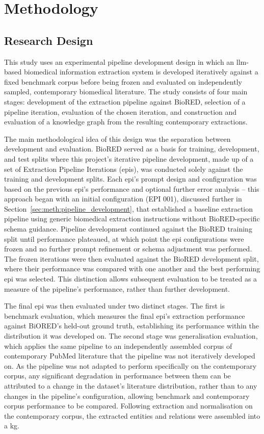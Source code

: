\chapter{Methodology}

\section{Research Design}
\label{sec:meth:research_design}
This study uses an experimental pipeline development design in which an \gls{llm}-based biomedical information extraction system is developed iteratively against a fixed benchmark corpus before being frozen and evaluated on independently sampled, contemporary biomedical literature. The study consists of four main stages: development of the extraction pipeline against BioRED, selection of a pipeline iteration, evaluation of the chosen iteration, and construction and evaluation of a knowledge graph from the resulting contemporary extractions.

The main methodological idea of this design was the separation between development and evaluation. BioRED served as a basis for training, development, and test splits where this project's iterative pipeline development, made up of a set of Extraction Pipeline Iterations (\glspl{epi}), was conducted solely against the training and development splits. Each \gls{epi}'s prompt design and configuration was based on the previous \gls{epi}'s performance and optional further error analysis -- this approach began with an initial configuration (EPI 001), discussed further in Section~\ref{sec:meth:pipeline_development}, that established a baseline extraction pipeline using generic biomedical extraction instructions without BioRED-specific schema guidance. Pipeline development continued against the BioRED training split until performance plateaued, at which point the \gls{epi} configurations were frozen and no further prompt refinement or schema adjustment was performed. The frozen iterations were then evaluated against the BioRED development split, where their performance was compared with one another and the best performing \gls{epi} was selected. This distinction allows subsequent evaluation to be treated as a measure of the pipeline's performance, rather than further development.

The final \gls{epi} was then evaluated under two distinct stages. The first is benchmark evaluation, which measures the final \gls{epi}'s extraction performance against BiORED's held-out ground truth, establishing its performance within the distribution it was developed on. The second stage was generalisation evaluation, which applies the same pipeline to an independently assembled corpus of contemporary PubMed literature that the pipeline was not iteratively developed on. As the pipeline was not adapted to perform specifically on the contemporary corpus, any significant degradation in performance between them can be attributed to a change in the dataset's literature distribution, rather than to any changes in the pipeline's configuration, allowing benchmark and contemporary corpus performance to be compared. Following extraction and normalisation on the contemporary corpus, the extracted entities and relations were assembled into a \gls{kg}.

